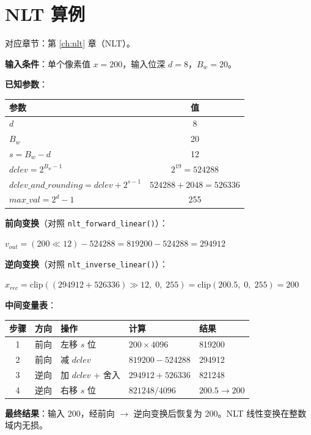 
\chapter{NLT 算例}\label{ex:nlt}

对应章节：第 \ref{ch:nlt} 章（NLT）。

\begin{examplebox}[title={例 1：NLT None（线性变换）}]

\textbf{输入条件}：单个像素值 $x = 200$，输入位深 $d = 8$，$B_w = 20$。

\medskip
\textbf{已知参数}：

\begin{tabular}{@{}lc@{}}
\toprule
参数 & 值 \\
\midrule
$d$ & 8 \\
$B_w$ & 20 \\
$s = B_w - d$ & 12 \\
$\mathit{dclev} = 2^{B_w-1}$ & $2^{19} = 524288$ \\
$\mathit{dclev\_and\_rounding} = \mathit{dclev} + 2^{s-1}$ & $524288 + 2048 = 526336$ \\
$\mathit{max\_val} = 2^d - 1$ & 255 \\
\bottomrule
\end{tabular}

\medskip
\textbf{前向变换}（对照 \texttt{nlt\_forward\_linear()}）：

$v_{\mathit{out}} = (200 \ll 12) - 524288 = 819200 - 524288 = 294912$

\textbf{逆向变换}（对照 \texttt{nlt\_inverse\_linear()}）：

$x_{\mathit{rec}} = \mathrm{clip}((294912 + 526336) \gg 12,\; 0,\; 255) = \mathrm{clip}(200.5,\; 0,\; 255) = 200$

\medskip
\textbf{中间变量表}：

\begin{tabular}{@{}cllll@{}}
\toprule
步骤 & 方向 & 操作 & 计算 & 结果 \\
\midrule
1 & 前向 & 左移 $s$ 位 & $200 \times 4096$ & 819200 \\
2 & 前向 & 减 $\mathit{dclev}$ & $819200 - 524288$ & 294912 \\
3 & 逆向 & 加 $\mathit{dclev}$ + 舍入 & $294912 + 526336$ & 821248 \\
4 & 逆向 & 右移 $s$ 位 & $821248 / 4096$ & $200.5 \to 200$ \\
\bottomrule
\end{tabular}

\medskip
\textbf{最终结果}：输入 200，经前向 $\to$ 逆向变换后恢复为 200。NLT 线性变换在整数域内无损。
\end{examplebox}


